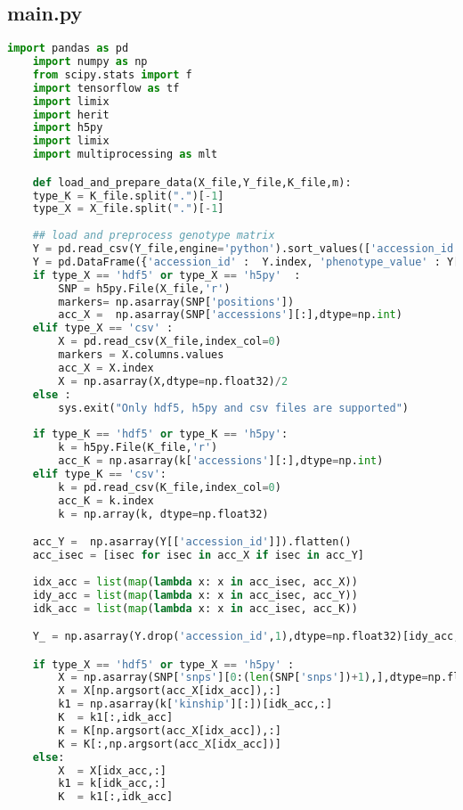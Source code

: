   \subsection{main.py}
  \begin{lstlisting}[language=Python]
    import pandas as pd 
    import numpy as np
    from scipy.stats import f
    import tensorflow as tf
    import limix
    import herit
    import h5py
    import limix
    import multiprocessing as mlt

    def load_and_prepare_data(X_file,Y_file,K_file,m):
    type_K = K_file.split(".")[-1]
    type_X = X_file.split(".")[-1]
    
    ## load and preprocess genotype matrix 
    Y = pd.read_csv(Y_file,engine='python').sort_values(['accession_id']).groupby('accession_id').mean()
    Y = pd.DataFrame({'accession_id' :  Y.index, 'phenotype_value' : Y[m]})
    if type_X == 'hdf5' or type_X == 'h5py'  :
        SNP = h5py.File(X_file,'r')
        markers= np.asarray(SNP['positions'])
        acc_X =  np.asarray(SNP['accessions'][:],dtype=np.int)
    elif type_X == 'csv' :
        X = pd.read_csv(X_file,index_col=0)
        markers = X.columns.values
        acc_X = X.index
        X = np.asarray(X,dtype=np.float32)/2
    else :
        sys.exit("Only hdf5, h5py and csv files are supported")
      
    if type_K == 'hdf5' or type_K == 'h5py':
        k = h5py.File(K_file,'r')
        acc_K = np.asarray(k['accessions'][:],dtype=np.int)
    elif type_K == 'csv':
        k = pd.read_csv(K_file,index_col=0)
        acc_K = k.index
        k = np.array(k, dtype=np.float32)

    acc_Y =  np.asarray(Y[['accession_id']]).flatten()
    acc_isec = [isec for isec in acc_X if isec in acc_Y]
        
    idx_acc = list(map(lambda x: x in acc_isec, acc_X))
    idy_acc = list(map(lambda x: x in acc_isec, acc_Y))
    idk_acc = list(map(lambda x: x in acc_isec, acc_K))

    Y_ = np.asarray(Y.drop('accession_id',1),dtype=np.float32)[idy_acc,:]

    if type_X == 'hdf5' or type_X == 'h5py' :
        X = np.asarray(SNP['snps'][0:(len(SNP['snps'])+1),],dtype=np.float32)[:,idx_acc].T
        X = X[np.argsort(acc_X[idx_acc]),:]
        k1 = np.asarray(k['kinship'][:])[idk_acc,:]
        K  = k1[:,idk_acc]
        K = K[np.argsort(acc_X[idx_acc]),:]
        K = K[:,np.argsort(acc_X[idx_acc])]
    else:
        X  = X[idx_acc,:]
        k1 = k[idk_acc,:]
        K  = k1[:,idk_acc]
        

\end{lstlisting}

